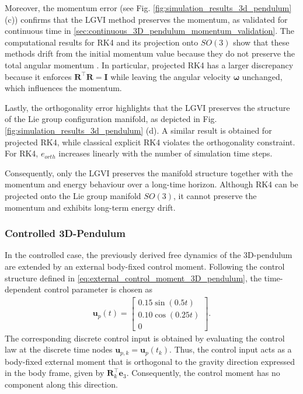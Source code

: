 Moreover, the momentum error (see Fig. \ref{fig:simulation_results_3d_pendulum} (c)) confirms that the LGVI method preserves the momentum, as validated for continuous time in \ref{sec:continuous_3D_pendulum_momentum_validation}. The computational results for RK4 and its projection onto $SO(3)$ show that these methods drift from the initial momentum value because they do not preserve the total angular momentum \cite{Lee2008}. In particular, projected RK4 has a larger discrepancy because it enforces $\bm{R}^\top\bm{R} = \bm{I}$ while leaving the angular velocity $\bm{\omega}$ unchanged, which influences the momentum.

Lastly, the orthogonality error highlights that the LGVI preserves the structure of the Lie group configuration manifold, as depicted in Fig. \ref{fig:simulation_results_3d_pendulum} (d). A similar result is obtained for projected RK4, while classical explicit RK4 violates the orthogonality constraint. For RK4, $e_{orth}$ increases linearly with the number of simulation time steps.

Consequently, only the LGVI preserves the manifold structure together with the momentum and energy behaviour over a long-time horizon. Although RK4 can be projected onto the Lie group manifold $SO(3)$, it cannot preserve the momentum and exhibits long-term energy drift.

\subsubsection{Controlled 3D-Pendulum}

In the controlled case, the previously derived free dynamics of the 3D-pendulum
are extended by an external body-fixed control moment. Following the control
structure defined in \eqref{eq:external_control_moment_3D_pendulum}, the time-dependent control parameter is chosen as
\begin{align}
    \label{eq:controlled_3d_pendulum_input_parameter}
    \bm{u}_p(t)
    =
    \begin{bmatrix}
        0.15\sin(0.5t) \\
        0.10\cos(0.25t) \\
        0
    \end{bmatrix}.
\end{align}
The corresponding discrete control input is obtained by evaluating the control law
at the discrete time nodes $\bm{u}_{p,k} =\bm{u}_p(t_k)$. Thus, the control input acts as a body-fixed external moment that is orthogonal to
the gravity direction expressed in the body frame, given by
$\bm{R}_k^{\top}\bm{e}_3$. Consequently, the control moment has no component
along this direction.

